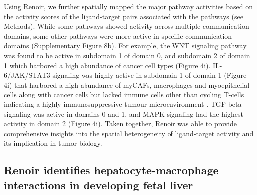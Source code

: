 
Using Renoir, we further spatially mapped the major pathway activities based on the activity scores of the ligand-target pairs associated with the pathways (see Methods). While some pathways showed activity across multiple communication domains, some other pathways were more active in specific communication domains (Supplementary Figure 8b). For example, the WNT signaling pathway was found to be active in subdomain 1 of domain 0, and subdomain 2 of domain 1 which harbored a high abundance of cancer cell types (Figure 4i). IL-6/JAK/STAT3 signaling was highly active in subdomain 1 of domain 1 (Figure 4i) that harbored a high abundance of myCAFs, macrophages and myoepithelial cells along with cancer cells but lacked immune cells other than cycling T-cells indicating a highly immunosuppressive tumour microenvironment \citep{Johnson2018}. TGF beta signaling was active in domains 0 and 1, and MAPK signaling had the highest activity in domain 2 (Figure 4i). Taken together, Renoir was able to provide comprehensive insights into the spatial heterogeneity of ligand-target activity and its implication in tumor biology.


\subsection*{Renoir identifies hepatocyte-macrophage interactions in developing fetal liver}

